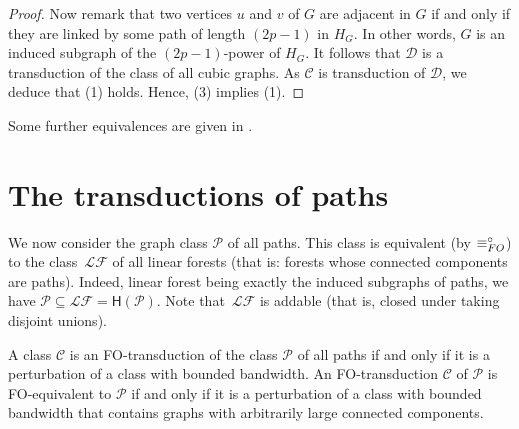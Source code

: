 \documentclass{lmcs}
\newcommand{\Cc}{\mathscr{C}}
\newcommand{\Dd}{\mathscr{D}}
\newcommand{\Pp}{\mathscr{P}}
\renewcommand{\FO}{{\rm FO}}
\theoremstyle{definition}
\begin{document}
\begin{proof}
	Now remark that two vertices $u$ and $v$ of $G$ are adjacent in $G$ if and only if they are linked by some path of length $(2p-1)$ in $H_G$. In other words, $G$ is an induced subgraph of the $(2p-1)$-power of $H_G$.
	It follows that $\Dd$ is a transduction of the class of all cubic graphs. As $\Cc$ is transduction of $\Dd$, we deduce that (1) holds. Hence, (3) implies (1).
\end{proof}


Some further equivalences are given in .
\section{The transductions of paths}
\label{sec:paths}

We now consider the graph class $\Pp$ of all paths. This class is  equivalent 
(by $\equiv_\FO^\circ$)
to the class~$\mathscr{L\!\!F}$ of all linear forests (that is: forests whose connected components are paths).
Indeed,  linear forest being exactly the induced subgraphs of paths, we have $\Pp\subseteq \mathscr{L\!\!F}=\mathsf H(\Pp)$.
Note that~$\mathscr{L\!\!F}$  is addable (that is, closed under taking disjoint unions). 
\begin{prop}
	\label{thm:transpath}
	A class $\Cc$ is an {\FO}-transduction of  the class  $\Pp$ of all paths if and only if it is a perturbation of a class with bounded bandwidth. 
	An \FO-transduction $\Cc$ of $\Pp$  is \FO-equivalent to $\Pp$ if and only if it is a perturbation of a class with bounded bandwidth that contains graphs with arbitrarily large connected components.
\end{prop}
\end{document}
